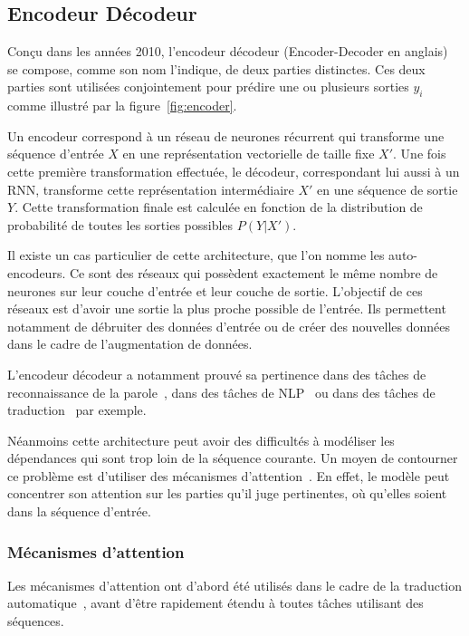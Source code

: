 \subsection{Encodeur Décodeur}


Conçu dans les années 2010, l'encodeur décodeur (Encoder-Decoder en anglais)~\cite{Cho2014} se compose, comme son nom l'indique, de deux parties distinctes. Ces deux parties sont utilisées conjointement pour prédire une ou plusieurs sorties $y_i$ comme illustré par la figure~\ref{fig:encoder}.

Un encodeur correspond à un réseau de neurones récurrent qui transforme une séquence d'entrée $X$ en une représentation vectorielle de taille fixe $X'$. Une fois cette première transformation effectuée, le décodeur, correspondant lui aussi à un RNN, transforme cette représentation intermédiaire $X'$ en une séquence de sortie $Y$. Cette transformation finale est calculée en fonction de la distribution de probabilité de toutes les sorties possibles $P(Y|X')$.

Il existe un cas particulier de cette architecture, que l'on nomme les auto-encodeurs. Ce sont des réseaux qui possèdent exactement le même nombre de neurones sur leur couche d'entrée et leur couche de sortie. L'objectif de ces réseaux est d'avoir une sortie la plus proche possible de l'entrée. Ils permettent notamment de débruiter des données d'entrée ou de créer des nouvelles données dans le cadre de l'augmentation de données.

L'encodeur décodeur a notamment prouvé sa pertinence dans des tâches de reconnaissance de la parole~\cite{Chiu2018}, dans des tâches de NLP~\cite{Hu2019} ou dans des tâches de traduction~\cite{Cho2014} par exemple.

Néanmoins cette architecture peut avoir des difficultés à modéliser les dépendances qui sont trop loin de la séquence courante. Un moyen de contourner ce problème est d'utiliser des mécanismes d'attention~\cite{Bahdanau2016}. En effet, le modèle peut concentrer son attention sur les parties qu'il juge pertinentes, où qu'elles soient dans la séquence d'entrée.

\subsubsection{Mécanismes d’attention}

Les mécanismes d'attention ont d'abord été utilisés dans le cadre de la traduction automatique~\cite{Luong2015}, avant d'être rapidement étendu à toutes tâches utilisant des séquences.

